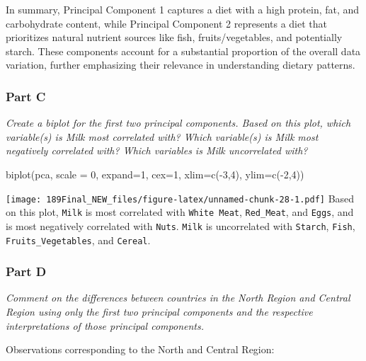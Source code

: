 \documentclass[
]{article}
\newenvironment{Shaded}{\begin{snugshade}}{\end{snugshade}}
\newcommand{\AttributeTok}[1]{\textcolor[rgb]{0.77,0.63,0.00}{#1}}
\newcommand{\DecValTok}[1]{\textcolor[rgb]{0.00,0.00,0.81}{#1}}
\newcommand{\FunctionTok}[1]{\textcolor[rgb]{0.00,0.00,0.00}{#1}}
\newcommand{\NormalTok}[1]{#1}
\newcommand{\SpecialCharTok}[1]{\textcolor[rgb]{0.00,0.00,0.00}{#1}}
\begin{document}
In summary, Principal Component 1 captures a diet with a high protein,
fat, and carbohydrate content, while Principal Component 2 represents a
diet that prioritizes natural nutrient sources like fish,
fruits/vegetables, and potentially starch. These components account for
a substantial proportion of the overall data variation, further
emphasizing their relevance in understanding dietary patterns.

\hypertarget{part-c-4}{%
\subsubsection{Part C}\label{part-c-4}}

\emph{Create a biplot for the first two principal components. Based on
this plot, which variable(s) is Milk most correlated with? Which
variable(s) is Milk most negatively correlated with? Which variables is
Milk uncorrelated with?}

\begin{Shaded}
\begin{Highlighting}[]
\FunctionTok{biplot}\NormalTok{(pca, }\AttributeTok{scale =} \DecValTok{0}\NormalTok{, }\AttributeTok{expand=}\DecValTok{1}\NormalTok{, }\AttributeTok{cex=}\DecValTok{1}\NormalTok{, }\AttributeTok{xlim=}\FunctionTok{c}\NormalTok{(}\SpecialCharTok{{-}}\DecValTok{3}\NormalTok{,}\DecValTok{4}\NormalTok{), }\AttributeTok{ylim=}\FunctionTok{c}\NormalTok{(}\SpecialCharTok{{-}}\DecValTok{2}\NormalTok{,}\DecValTok{4}\NormalTok{))}
\end{Highlighting}
\end{Shaded}

\texttt{[image: 189Final\_NEW\_files/figure-latex/unnamed-chunk-28-1.pdf]}
Based on this plot, \texttt{Milk} is most correlated with
\texttt{White\ Meat}, \texttt{Red\_Meat}, and \texttt{Eggs}, and is most
negatively correlated with \texttt{Nuts}. \texttt{Milk} is uncorrelated
with \texttt{Starch}, \texttt{Fish}, \texttt{Fruits\_Vegetables}, and
\texttt{Cereal}.

\hypertarget{part-d-3}{%
\subsubsection{Part D}\label{part-d-3}}

\emph{Comment on the differences between countries in the North Region
and Central Region using only the first two principal components and the
respective interpretations of those principal components.}

Observations corresponding to the North and Central Region:
\end{document}
